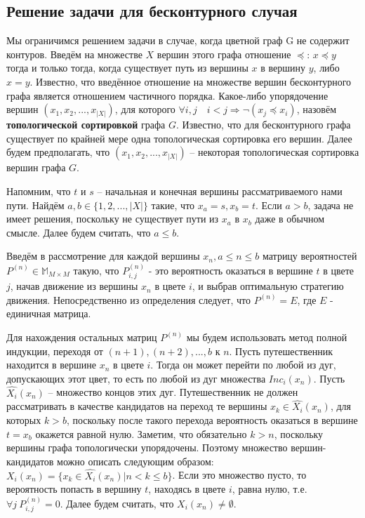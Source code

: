 \subsection{Решение задачи для бесконтурного случая}
\par Мы ограничимся решением задачи в случае, когда цветной граф G не содержит контуров. Введём на множестве $X$ вершин этого графа отношение $\preceq$: $x \preceq y$ тогда и только тогда, когда существует путь из вершины $x$ в вершину $y$, либо $x = y$. Известно, что введённое отношение на множестве вершин бесконтурного графа является отношением частичного порядка. Какое-либо упорядочение вершин $(x_1, x_2, ..., x_{|X|})$, для которого $\forall i, j \quad i < j \Rightarrow \neg (x_j \preceq x_i)$, назовём \textbf{топологической сортировкой} графа $G$. Известно, что для бесконтурного графа существует по крайней мере одна топологическая сортировка его вершин. Далее будем предполагать, что $(x_1, x_2, ..., x_{|X|})$ -- некоторая топологическая сортировка вершин графа $G$.
\par Напомним, что $t$ и $s$ -- начальная и конечная вершины рассматриваемого нами пути. Найдём $a, b \in \{1, 2, ..., |X|\}$ такие, что $x_a = s, x_b = t$. Если $a > b$, задача не имеет решения, поскольку не существует пути из $x_a$ в $x_b$ даже в обычном смысле. Далее будем считать, что $a \leq b$.
\par Введём в рассмотрение для каждой вершины $x_n, a \leq n \leq b$ матрицу вероятностей $P^{(n)} \in \mathbb{M}_{M \times M}$ такую, что $P^{(n)}_{i,j}$ - это вероятность оказаться в вершине $t$ в цвете $j$, начав движение из вершины $x_{n}$ в цвете $i$, и выбрав оптимальную стратегию движения. Непосредственно из определения следует, что $P^{(n)} = E$, где $E$ - единичная матрица.
\par Для нахождения остальных матриц $P^{(n)}$ мы будем использовать метод полной индукции, переходя от $(n + 1), (n + 2), ..., b$ к $n$. Пусть путешественник находится в вершине $x_n$ в цвете $i$. Тогда он может перейти по любой из дуг, допускающих этот цвет, то есть по любой из дуг множества $Inc_i(x_n)$. Пусть $\hat{X_i}(x_n)$ -- множество концов этих дуг. Путешественник не должен рассматривать в качестве кандидатов на переход те вершины $x_k \in \hat{X_i}(x_n)$, для которых $k > b$, поскольку после такого перехода вероятность оказаться в вершине $t = x_b$ окажется равной нулю. Заметим, что обязательно $k > n$, поскольку вершины графа топологически упорядочены. Поэтому множество вершин-кандидатов можно описать следующим образом: $X_i(x_n) = \{x_k \in \hat{X_i}(x_n) | n < k \leq b\}$. Если это множество пусто, то вероятность попасть в вершину $t$, находясь в цвете $i$, равна нулю, т.е. $\forall j \: P^{(n)}_{i,j} = 0$. Далее будем считать, что $X_i(x_n) \ne \emptyset$.
